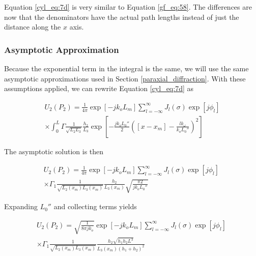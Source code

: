 Equation \ref{cyl_eq:7d} is very similar to Equation \ref{gf_eq:58}. The differences are now that the denominators have the actual path lengths instead of just the distance along the $x$ axis.

\subsubsection{Asymptotic Approximation}
Because the exponential term in the integral is the same, we will use the same asymptotic approximations used in Section \ref{paraxial_diffraction}. With these assumptions applied, we can rewrite Equation \ref{cyl_eq:7d} as

\begin{equation}
\begin{gathered}
U_2(P_2) = \frac{1}{4\pi} \exp[-jk_oL_m] \sum_{l=-\infty}^{\infty}J_l(\sigma)\exp\left[j\phi_l\right] \\
\times \int_0^L  \Gamma \frac{1}{\sqrt{L_2L_3}}\frac{h_2}{L_3}\exp\left[-\frac{jk_oL_0''}{2}\left([x-x_m]-\frac{lk_{\omega}}{k_oL_0''} \right)^2\right]
\label{cyl_eq:8}
\end{gathered}
\end{equation}
\renewcommand{\baselinestretch}{2} \small\normalsize

\noindent The asymptotic solution is then

\begin{equation}
\begin{gathered}
U_2(P_2) = \frac{1}{4\pi} \exp[-jk_oL_m] \sum_{l=-\infty}^{\infty}J_l(\sigma)\exp\left[j\phi_l\right]\  \\
\times \Gamma_1 \frac{1}{\sqrt{L_2(x_m)L_3(x_m)}}\frac{h_2}{L_3(x_m)}\sqrt{\frac{\pi 2}{jk_oL_0''}}
\label{cyl_eq:9}
\end{gathered}
\end{equation}
\renewcommand{\baselinestretch}{2} \small\normalsize

\noindent Expanding $L_0''$ and collecting terms yields

\begin{equation}
\begin{gathered}
U_2(P_2) = \sqrt{\frac{1}{8\pi j k_o}} \exp[-jk_oL_m] \sum_{l=-\infty}^{\infty}J_l(\sigma)\exp\left[j\phi_l\right]\  \\
\times \Gamma_1 \frac{1}{\sqrt{L_2(x_m)L_3(x_m)}}\frac{h_2\sqrt{h_1h_2L^3}}{L_3(x_m)(h_1+h_2)^2}
\label{cyl_eq:10}
\end{gathered}
\end{equation}
\renewcommand{\baselinestretch}{2} \small\normalsize

